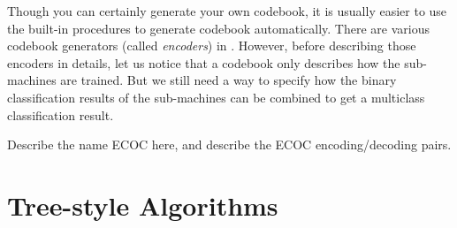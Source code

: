 Though you can certainly generate your own codebook, it is usually easier to
use the \shogun{} built-in procedures to generate codebook automatically. There
are various codebook generators (called \emph{encoders}) in \shogun{}. However,
before describing those encoders in details, let us notice that a codebook 
only describes how the sub-machines are trained. But we still need a
way to specify how the binary classification results of the sub-machines can be
combined to get a multiclass classification result.

Describe the name ECOC here, and describe the \shogun{} ECOC encoding/decoding
pairs.

\section{Tree-style Algorithms}
\label{sec:multiclass-tree}
